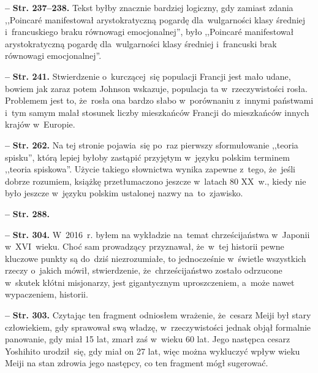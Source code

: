 \documentclass[a4paper,11pt]{article}
\newcommand{\spaceFour}{0.5em}
\newcommand{\tb}{\textbf}
\newcommand{\noi}{\noindent}
\newcommand{\start}{\noi \tb{--} {}}
\newcommand{\Str}[1]{\tb{Str. #1.}}
\begin{document}
\start \Str{237--238} Tekst byłby znacznie bardziej logiczny, gdy
zamiast zdania ,,Poincar\'{e} manifestował arystokratyczną pogardę
dla~wulgarności klasy średniej i~francuskiego braku równowagi
emocjonalnej'', było ,,Poincar\'{e} manifestował arystokratyczną
pogardę dla~wulgarności klasy średniej i~francuski brak równowagi
emocjonalnej''.

\vspace{\spaceFour}


\start \Str{241} Stwierdzenie o~kurczącej~się populacji Francji jest
mało udane, bowiem jak zaraz potem Johnson wskazuje, populacja ta
w~rzeczywistości rosła. Problemem jest to, że~rosła ona bardzo słabo
w~porównaniu z~innymi państwami i~tym samym malał stosunek liczby
mieszkańców Francji do mieszkańców innych krajów w~Europie.

\vspace{\spaceFour}


\start \Str{262} Na tej stronie pojawia~się po~raz pierwszy
sformułowanie ,,teoria spisku'', którą lepiej byłoby zastąpić
przyjętym w~języku polskim terminem ,,teoria spiskowa''. Użycie
takiego słownictwa wynika zapewne z~tego, że~jeśli dobrze rozumiem,
książkę przetłumaczono jeszcze w~latach 80 XX~w., kiedy nie było
jeszcze w~języku polskim ustalonej nazwy na~to~zjawisko.

\vspace{\spaceFour}


\start \Str{288}

\vspace{\spaceFour}


\start \Str{304} W~2016~r. byłem na wykładzie na~temat chrześcijaństwa
w~Japonii w~XVI~wieku. Choć sam prowadzący przyznawał, że~w~tej
historii pewne kluczowe punkty są do~dziś niezrozumiałe, to
jednocześnie w~świetle wszystkich rzeczy o~jakich mówił, stwierdzenie,
że~chrześcijaństwo zostało odrzucone w~skutek kłótni misjonarzy, jest
gigantycznym uproszczeniem, a~może nawet wypaczeniem, historii.

\vspace{\spaceFour}


\start \Str{303} Czytając ten fragment odniosłem wrażenie, że~cesarz
Meiji był stary człowiekiem, gdy sprawował swą władzę,
w~rzeczywistości jednak objął formalnie panowanie, gdy miał 15 lat,
zmarł zaś w~wieku 60 lat. Jego następca cesarz Yoshihito urodził~się,
gdy miał on 27 lat, więc można wykluczyć wpływ wieku Meiji na stan
zdrowia jego następcy, co ten fragment mógł sugerować.
\end{document}
